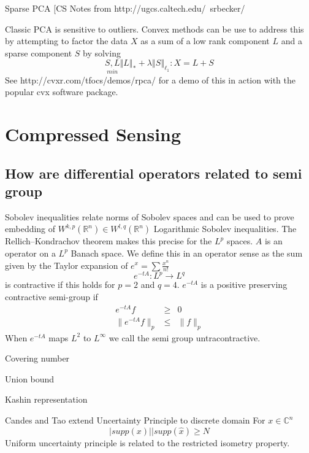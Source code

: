 \documentclass[a4paper]{article}
\newcommand{\Real}{\mathbb R}
\newcommand{\Complex}{\mathbb C}
\newcommand{\norm}[1]{\left\Vert#1\right\Vert}
\theoremstyle{plain}
\theoremstyle{definition}
\theoremstyle{remark}
\numberwithin{equation}{section}
\begin{document}
Sparse PCA
[CS Notes from http://ugcs.caltech.edu/~srbecker/

Classic PCA is sensitive to outliers.  Convex methods can be use to address this by attempting to factor the data $X$ as a sum of a low rank component $L$ and a sparse component $S$ by solving
\begin{equation*}
\underset{min}{S,L} \norm{L}_* + \lambda \norm{S}_{\ell_1}  : X=L+S
\end{equation*}
See http://cvxr.com/tfocs/demos/rpca/ for a demo of this in action with the popular cvx software package.



\section{Compressed Sensing}


\subsection{How are differential operators related to semi group}

Sobolev inequalities relate norms of Sobolev spaces and can be used to prove embedding of $W^{k,p}(\Real^n) \in W^{l,q}(\Real^n)$ Logarithmic Sobolev inequalities.  The Rellich–Kondrachov theorem makes this precise for the $L^p$ spaces.
$A$ is an operator on a $L^p$ Banach space. We define this in an operator sense as the sum given by the Taylor expansion of $e^x = \sum \frac{x^n}{n!}$
\begin{equation*}
  e^{-t A} : L^p \rightarrow L^q
\end{equation*} is contractive if this holds for $p=2$ and $q=4$.
$e^{-t A}$ is a positive preserving contractive semi-group if
\begin{eqnarray*}
  e^{-t A} f &\geq& 0 \\
  \parallel e^{-t A} f \parallel_p &\leq& \parallel f \parallel_p
\end{eqnarray*}
When $e^{-t A}$ maps $L^2$ to $L^\infty$ we call the semi group untracontractive.

Covering number

Union bound

Kashin representation

Candes and Tao extend Uncertainty Principle to discrete domain
For $x \in \Complex^n$
\begin{equation*}
  |supp(x)| |supp(\hat{x}) \geq N
\end{equation*}
Uniform uncertainty principle is related to the restricted isometry property.
\end{document}
